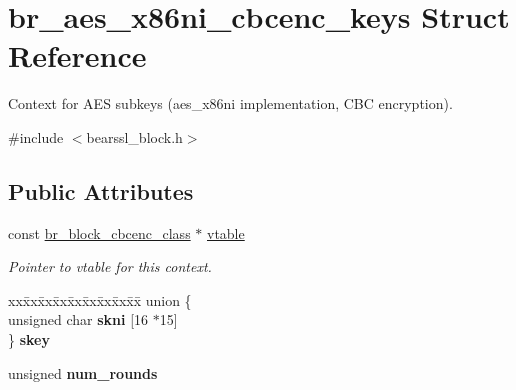 \hypertarget{structbr__aes__x86ni__cbcenc__keys}{}\section{br\+\_\+aes\+\_\+x86ni\+\_\+cbcenc\+\_\+keys Struct Reference}
\label{structbr__aes__x86ni__cbcenc__keys}


Context for A\+ES subkeys ({\ttfamily aes\+\_\+x86ni} implementation, C\+BC encryption).  




{\ttfamily \#include $<$bearssl\+\_\+block.\+h$>$}

\subsection*{Public Attributes}
\begin{DoxyCompactItemize}
\item 
\mbox{\label{structbr__aes__x86ni__cbcenc__keys_ab6c00f24ec0b4614c2e0e84f4a22a691}} 
const \hyperlink{bearssl__block_8h_ad0ecff523e21a74dc1143dcfa52aa251}{br\+\_\+block\+\_\+cbcenc\+\_\+class} $\ast$ \hyperlink{structbr__aes__x86ni__cbcenc__keys_ab6c00f24ec0b4614c2e0e84f4a22a691}{vtable}
\begin{DoxyCompactList}\small\item\em Pointer to vtable for this context. \end{DoxyCompactList}\item 
\mbox{\label{structbr__aes__x86ni__cbcenc__keys_af290db14a4125e9714d87f0c18c0c2c2}} 
\begin{tabbing}
xx\=xx\=xx\=xx\=xx\=xx\=xx\=xx\=xx\=\kill
union \{\\
\>unsigned char {\bfseries skni} \mbox{[}16 $\ast$15\mbox{]}\\
\} {\bfseries skey}\\

\end{tabbing}\item 
\mbox{\label{structbr__aes__x86ni__cbcenc__keys_a64a6e35cfefdc6e5b5303ca8726043db}} 
unsigned {\bfseries num\+\_\+rounds}
\end{DoxyCompactItemize}


